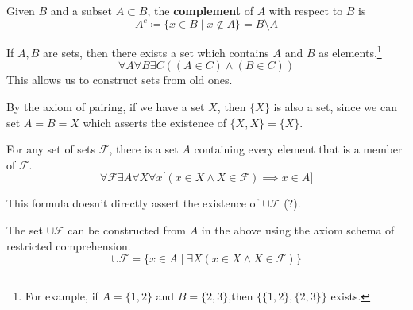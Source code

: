   \begin{definition}
    Given $B$ and a subset $A \subset B$, the \textbf{complement} of $A$ with respect to $B$ is 
    \begin{equation}
      A^c \coloneqq \{ x \in B \mid x \not\in A \} = B \setminus A
    \end{equation}
  \end{definition}

  \begin{axiom}
    If $A, B$ are sets, then there exists a set which contains $A$ and $B$ as elements.\footnote{For example, if $A = \{1, 2\}$ and $B = \{2, 3\}$,then $\{\{1, 2\}, \{2, 3\}\}$ exists.}
    \begin{equation}
      \forall A \forall B \exists C((A \in C) \land (B \in C))
    \end{equation}
    This allows us to construct sets from old ones. 
  \end{axiom}

  \begin{theorem}
    By the axiom of pairing, if we have a set $X$, then $\{X\}$ is also a set, since we can set $A = B = X$ which asserts the existence of $\{X, X\} = \{X\}$. 
  \end{theorem}

  \begin{axiom}
    For any set of sets $\mathcal{F}$, there is a set $A$ containing every element that is a member of $\mathcal{F}$.
    \begin{equation}
      \forall \mathcal{F} \exists A \forall X \forall x \big[ (x \in X \land X \in \mathcal{F}) \implies x \in A \big]
    \end{equation}
  \end{axiom}

  This formula doesn't directly assert the existence of $\cup \mathcal{F}$ (?). 

  \begin{definition}[Union]
    The set $\cup \mathcal{F}$ can be constructed from $A$ in the above using the axiom schema of restricted comprehension. 
    \begin{equation}
      \cup \mathcal{F} = \{ x \in A \mid \exists X (x \in X \land X \in \mathcal{F} ) \}
    \end{equation}
  \end{definition}

